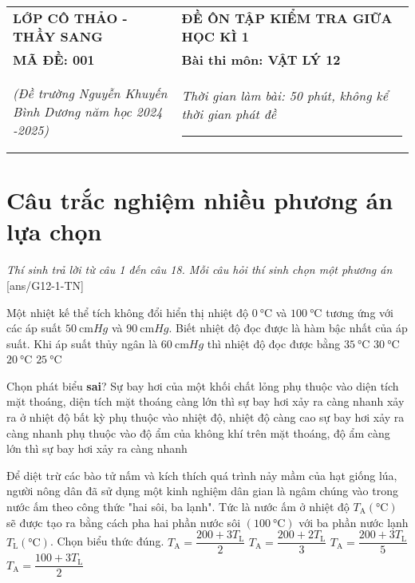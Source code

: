 \begin{tabular}{M{6.5cm}M{11cm}}
	\textbf{LỚP CÔ THẢO - THẦY SANG}& \textbf{ĐỀ ÔN TẬP KIỂM TRA GIỮA HỌC KÌ 1}\\
	\textbf{MÃ ĐỀ: 001}& \textbf{Bài thi môn: VẬT LÝ 12}\\
	\textit{(Đề trường Nguyễn Khuyến \newline Bình Dương năm học 2024 -2025)}& \textit{Thời gian làm bài: 50 phút, không kể thời gian phát đề}
	
	\noindent\rule{4cm}{0.8pt} \\
\end{tabular}
\setcounter{section}{0}
\section{Câu trắc nghiệm nhiều phương án lựa chọn}
\textit{Thí sinh trả lời từ câu 1 đến câu 18. Mỗi câu hỏi thí sinh chọn một phương án}
\setcounter{ex}{0}
[ans/G12-1-TN]
\begin{ex}
	Một nhiệt kế thể tích không đổi hiển thị nhiệt độ $\SI{0}{\celsius}$ và $\SI{100}{\celsius}$ tương ứng với các áp suất $\SI{50}{\centi\meter Hg}$ và $\SI{90}{\centi\meter Hg}$. Biết nhiệt độ đọc được là hàm bậc nhất của áp suất. Khi áp suất thủy ngân là $\SI{60}{\centi\meter Hg}$ thì nhiệt độ đọc được bằng
	\choice
	{$\SI{35}{\celsius}$}
	{$\SI{30}{\celsius}$}
	{$\SI{20}{\celsius}$}
	{\True $\SI{25}{\celsius}$}
\end{ex}
\begin{ex}
	Chọn phát biểu \textbf{sai}? Sự bay hơi của một khối chất lỏng
	\choice
	{phụ thuộc vào diện tích mặt thoáng, diện tích mặt thoáng càng lớn thì sự bay hơi xảy ra càng nhanh}
	{xảy ra ở nhiệt độ bất kỳ}
	{phụ thuộc vào nhiệt độ, nhiệt độ càng cao sự bay hơi xảy ra càng nhanh}
	{\True phụ thuộc vào độ ẩm của không khí trên mặt thoáng, độ ẩm càng lớn thì sự bay hơi xảy ra càng nhanh}
\end{ex}
\begin{ex}
	Để diệt trừ các bào tử nấm và kích thích quá trình nảy mầm của hạt giống lúa, người nông dân đã sử dụng một kinh nghiệm dân gian là ngâm chúng vào trong nước ấm theo công thức "hai sôi, ba lạnh". Tức là nước ấm ở nhiệt độ $T_{\mathrm{A}}\left(\si{\celsius}\right)$ sẽ được tạo ra bằng cách pha hai phần nước sôi $\left(\SI{100}{\celsius}\right)$ với ba phần nước lạnh $T_{\mathrm{L}}\left(\si{\celsius}\right)$. Chọn biểu thức đúng.
	\choice
	{$T_{\mathrm{A}}=\dfrac{200+3 T_{\mathrm{L}}}{2}$}
	{$T_{\mathrm{A}}=\dfrac{200+2 T_{\mathrm{L}}}{3}$}
	{\True $T_{\mathrm{A}}=\dfrac{200+3 T_{\mathrm{L}}}{5}$}
	{$T_{\mathrm{A}}=\dfrac{100+3 T_{\mathrm{L}}}{2}$}
\end{ex}
